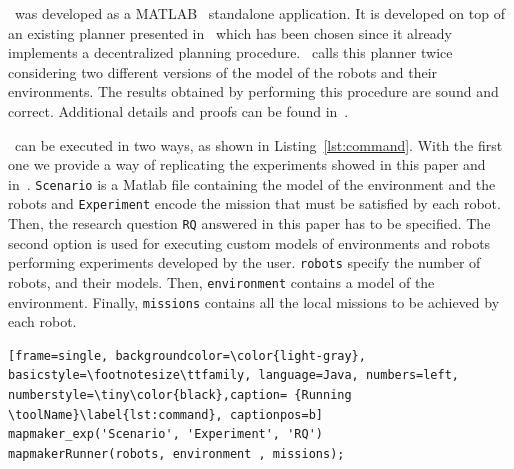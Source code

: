 
\toolName\  was developed as a  MATLAB~\cite{matlab} standalone application.
It is developed on top of an existing  planner presented in~\cite{tumova2016multi} which has been chosen since it already implements a decentralized planning procedure.
\toolName\ calls this planner twice considering two different versions of the model of the robots and their environments. 
The results obtained by performing this procedure are sound and correct.
Additional details and proofs can be found in~\cite{mapmaker17}.


\toolName\ can be executed in two ways, as shown in Listing~\ref{lst:command}.
With the first one we provide a way of replicating the experiments showed in this paper and in~\cite{mapmaker17}.
\texttt{Scenario} is a Matlab file containing the model of the environment and the robots and \texttt{Experiment} encode the mission that must be satisfied by each robot.
Then, the research question \texttt{RQ} answered in this paper has to be specified.
The second option is used for executing custom models of environments and robots performing experiments developed by the user.
\texttt{robots} specify the number of robots, and their models.
Then, \texttt{environment} contains a model of the environment.
Finally, \texttt{missions} contains all the local missions to be achieved by each robot.

\begin{lstlisting}[frame=single, backgroundcolor=\color{light-gray}, basicstyle=\footnotesize\ttfamily, language=Java, numbers=left, numberstyle=\tiny\color{black},caption= {Running \toolName}\label{lst:command}, captionpos=b]
mapmaker_exp('Scenario', 'Experiment', 'RQ')
mapmakerRunner(robots, environment , missions);
\end{lstlisting}







